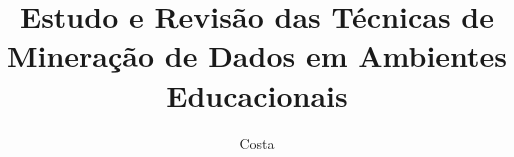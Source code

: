\documentclass[ti]{texufpel} %
\title{Estudo e Revisão das Técnicas de Mineração de Dados em Ambientes Educacionais}
\author{Costa}{Alexandre Gomes da}
\begin{document}

\maketitle 

\sloppy




\end{document}
